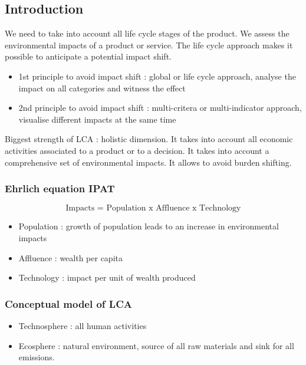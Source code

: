 \documentclass[../main.tex]{subfiles}
\begin{document}
\localtableofcontents

\subsection{Introduction}
We need to take into account all life cycle stages of the product. We assess the environmental impacts of a product or service. The life cycle approach makes it possible to anticipate a potential impact shift.\\

\begin{itemize}
    \item 1st principle to avoid impact shift : global or life cycle approach, analyse the impact on all categories and witness the effect\\
    \item 2nd principle to avoid impact shift : multi-critera or multi-indicator approach, visualise different impacts at the same time\\
\end{itemize}

Biggest strength of LCA : holistic dimension. It takes into account all economic activities associated to a product or to a decision. It takes into account a comprehensive set of environmental impacts. It allows to avoid burden shifting.\\

\subsubsection{Ehrlich equation IPAT}
\begin{equation}
    \text{Impacts = Population x Affluence x Technology}
\end{equation}
\begin{itemize}
    \item Population : growth of population leads to an increase in environmental impacts\\
    \item Affluence : wealth per capita\\
    \item Technology : impact per unit of wealth produced\\
\end{itemize}

\subsubsection{Conceptual model of LCA}
\begin{itemize}
    \item Technosphere : all human activities\\
    \item Ecosphere : natural environment, source of all raw materials and sink for all emissions.\\
\end{itemize}
\end{document}
